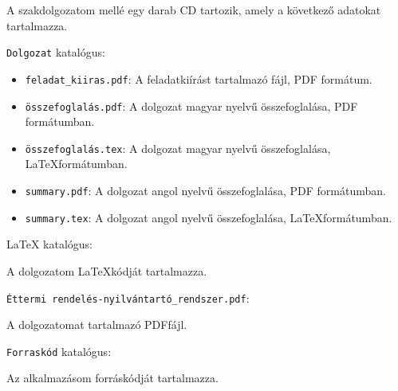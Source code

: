
A szakdolgozatom mellé egy darab CD tartozik, amely a következő adatokat tartalmazza.

\bigskip

\noindent \texttt{Dolgozat} katalógus:

\begin{itemize}
\item \texttt{feladat\_kiiras.pdf}: A feladatkiírást tartalmazó fájl, PDF formátum.
\item \texttt{összefoglalás.pdf}: A dolgozat magyar nyelvű összefoglalása, PDF formátumban.
\item \texttt{összefoglalás.tex}: A dolgozat magyar nyelvű összefoglalása, \LaTeX formátumban.
\item \texttt{summary.pdf}: A dolgozat angol nyelvű összefoglalása, PDF formátumban.
\item \texttt{summary.tex}: A dolgozat angol nyelvű összefoglalása, \LaTeX formátumban.
\end{itemize}

\bigskip

\noindent LaTeX katalógus:

A dolgozatom \LaTeX kódját tartalmazza.

\bigskip

\noindent \texttt{Éttermi rendelés-nyilvántartó\_rendszer.pdf}:

A dolgozatomat tartalmazó PDFfájl.

\bigskip

\noindent \texttt{Forraskód} katalógus:

Az alkalmazásom forráskódját tartalmazza.
